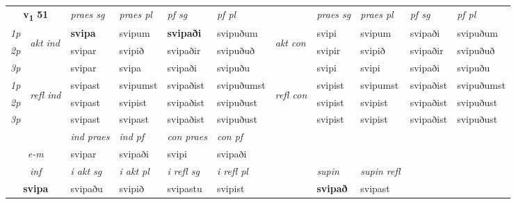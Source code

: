 \noindent
\begin{tabular}{lllllllllll} \toprule
\multicolumn{2}{c}{\textbf{v{\textsubscript{1}}} \Large{\textbf{51}}}  &  \textit{praes sg}  & \textit{praes pl}  &\textit{ pf sg} & \textit{pf pl} &  &  \textit{praes sg}  & \textit{praes pl}  & \textit{pf sg} & \textit{pf pl } \\*
	\cmidrule{3-6} \cmidrule{8-11}
 {\textit{1p}} & \multirow{3}{*}{\begin{turn}{90}\textit{akt ind}\end{turn}} & \textbf{svipa} & svipum & \textbf{svipaði} & svipuðum & \multirow{3}{*}{\begin{turn}{90}\textit{akt con}\end{turn}} &svipi & svipum & svipaði & svipuðum\\*
 {\textit{2p}} &  &  svipar  & svipið & svipaðir & svipuðuð & & svipir & svipið & svipaðir & svipuðuð \\*
{\textit{3p}} &  & svipar & svipa & svipaði & svipuðu & & svipi & svipi& svipaði & svipuðu \\*
\cmidrule{3-6} \cmidrule{8-11}
 {\textit{1p}} & \multirow{3}{*}{\begin{turn}{90}\textit{refl ind}\end{turn}}  & svipast & svipumst & svipaðist & svipuðumst & \multirow{3}{*}{\begin{turn}{90}\textit{refl con}\end{turn}}  &svipist & svipumst & svipaðist & svipuðumst \\*
 {\textit{2p}} &  & svipast & svipist & svipaðist & svipuðust & &svipist & svipist & svipaðist & svipuðust \\*
 {\textit{3p}}  & & svipast & svipast & svipaðist & svipuðust & & svipist & svipist& svipaðist & svipuðust \\*
\cmidrule{3-6} \cmidrule{8-11}

   & &  \textit{ind praes} & \textit{ind pf} & \textit{con praes} & \textit{con pf} \\*
\multicolumn{2}{c}{ \textit{e-m} } & svipar & svipaði & svipi & svipaði \\*

\cmidrule{3-9}
   \multicolumn{2}{c}{\textit{inf}}  & \textit{i akt sg} & \textit{i akt pl} & \textit{i refl sg} & \textit{i refl pl}  && \textit{supin} & \textit{supin refl}  \\*
  \multicolumn{2}{c}{\textbf{svipa}} & svipaðu  & svipið & svipastu & svipist  &&  \textbf{svipað} & svipast  \\*
\end{tabular}

